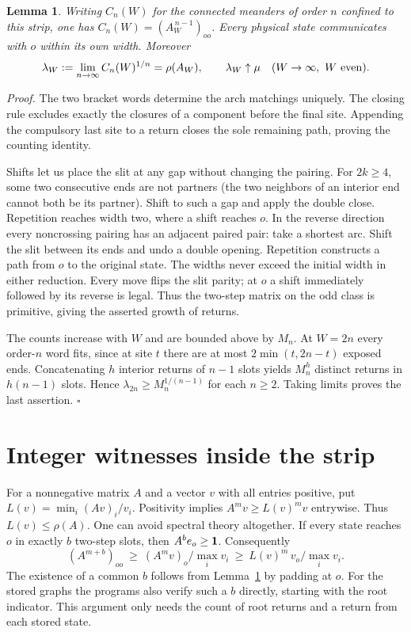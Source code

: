 \documentclass[11pt]{article}
\newenvironment{proof}[1][Proof]{\par\noindent\textit{#1.} }{\unskip\nobreak\hfill\hbox{$\square$}\par}
\newtheorem{lemma}[theorem]{Lemma}
\begin{document}
\begin{lemma}\label{strip}
Writing \(C_n(W)\) for the connected meanders of order \(n\) confined to this strip, one has \(C_n(W)=(A_W^{\,n-1})_{oo}\). Every physical state communicates with \(o\) within its own width. Moreover
\[
 \lambda_W:=\lim_{n\to\infty} C_n(W)^{1/n}=\rho(A_W),\qquad
        \lambda_W\uparrow\mu\quad (W\to\infty,\ W\ {\rm even}).
\]
\end{lemma}
\begin{proof}
The two bracket words determine the arch matchings uniquely. The closing rule excludes exactly the closures of a component before the final site. Appending the compulsory last site to a return closes the sole remaining path, proving the counting identity.

Shifts let us place the slit at any gap without changing the pairing. For \(2k\ge4\), some two consecutive ends are not partners (the two neighbors of an interior end cannot both be its partner). Shift to such a gap and apply the double close. Repetition reaches width two, where a shift reaches \(o\). In the reverse direction every noncrossing pairing has an adjacent paired pair: take a shortest arc. Shift the slit between its ends and undo a double opening. Repetition constructs a path from \(o\) to the original state. The widths never exceed the initial width in either reduction. Every move flips the slit parity; at \(o\) a shift immediately followed by its reverse is legal. Thus the two-step matrix on the odd class is primitive, giving the asserted growth of returns.

The counts increase with \(W\) and are bounded above by \(M_n\). At \(W=2n\) every order-\(n\) word fits, since at site \(t\) there are at most \(2\min(t,2n-t)\) exposed ends. Concatenating \(h\) interior returns of \(n-1\) slots yields \(M_n^h\) distinct returns in \(h(n-1)\) slots. Hence \(\lambda_{2n}\ge M_n^{1/(n-1)}\) for each \(n\ge2\). Taking limits proves the last assertion.
\end{proof}

\section{Integer witnesses inside the strip}\label{integer}
For a nonnegative matrix \(A\) and a vector \(v\) with all entries positive, put \(L(v)=\min_i(Av)_i/v_i\). Positivity implies \(A^m v\ge L(v)^m v\) entrywise. Thus \(L(v)\le\rho(A)\). One can avoid spectral theory altogether. If every state reaches \(o\) in exactly \(b\) two-step slots, then \(A^b e_o\ge{\bf1}\). Consequently
\[
 (A^{m+b})_{oo}\ \ge\ (A^m v)_o/\max_i v_i
             \ \ge\ L(v)^m\,v_o/\max_i v_i .
\]
The existence of a common \(b\) follows from Lemma~\ref{strip} by padding at \(o\). For the stored graphs the programs also verify such a \(b\) directly, starting with the root indicator. This argument only needs the count of root returns and a return from each stored state.
\end{document}
